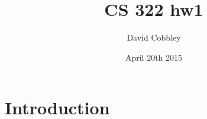 \documentclass{article}
\title{CS 322 hw1}
\author{David Cobbley }
\date{April 20th 2015}
\begin{document}
\maketitle

\section{Introduction}
\end{document}

